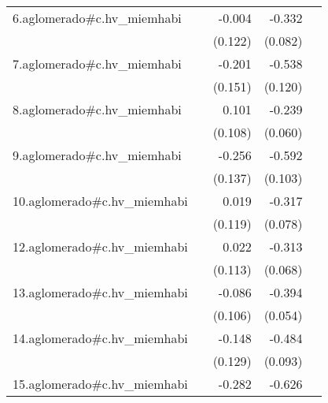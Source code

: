 {\begin{longtable}{l*{4}{D{.}{.}{-1}}}
\addlinespace
6.aglomerado#c.hv\_miemhabi&                     &      -0.004         &      -0.332\sym{***}&                     \\
            &                     &     (0.122)         &     (0.082)         &                     \\
\addlinespace
7.aglomerado#c.hv\_miemhabi&                     &      -0.201         &      -0.538\sym{***}&                     \\
            &                     &     (0.151)         &     (0.120)         &                     \\
\addlinespace
8.aglomerado#c.hv\_miemhabi&                     &       0.101         &      -0.239\sym{***}&                     \\
            &                     &     (0.108)         &     (0.060)         &                     \\
\addlinespace
9.aglomerado#c.hv\_miemhabi&                     &      -0.256         &      -0.592\sym{***}&                     \\
            &                     &     (0.137)         &     (0.103)         &                     \\
\addlinespace
10.aglomerado#c.hv\_miemhabi&                     &       0.019         &      -0.317\sym{***}&                     \\
            &                     &     (0.119)         &     (0.078)         &                     \\
\addlinespace
12.aglomerado#c.hv\_miemhabi&                     &       0.022         &      -0.313\sym{***}&                     \\
            &                     &     (0.113)         &     (0.068)         &                     \\
\addlinespace
13.aglomerado#c.hv\_miemhabi&                     &      -0.086         &      -0.394\sym{***}&                     \\
            &                     &     (0.106)         &     (0.054)         &                     \\
\addlinespace
14.aglomerado#c.hv\_miemhabi&                     &      -0.148         &      -0.484\sym{***}&                     \\
            &                     &     (0.129)         &     (0.093)         &                     \\
\addlinespace
15.aglomerado#c.hv\_miemhabi&                     &      -0.282         &      -0.626\sym{***}&                     \\

\end{longtable}}
